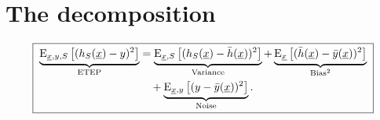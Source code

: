 \section{The decomposition}

\begin{theorem}
\[
  \boxed{\;
  \begin{aligned}
  \underbrace{\operatorname{E}_{\underline{x},y,S}\big[(h_S(\underline{x})-y)^2\big]}_{\text{ETEP}}
  &=\underbrace{\operatorname{E}_{\underline{x},S}\big[(h_S(\underline{x})-\bar h(\underline{x}))^2\big]}_{\text{Variance}}
  +\underbrace{\operatorname{E}_{\underline{x}}\big[(\bar h(\underline{x})-\bar y(\underline{x}))^2\big]}_{\text{Bias}^2}\\
  &\quad+\underbrace{\operatorname{E}_{\underline{x},y}\big[(y-\bar y(\underline{x}))^2\big]}_{\text{Noise}}.
  \end{aligned}\;}
\]
\end{theorem}
